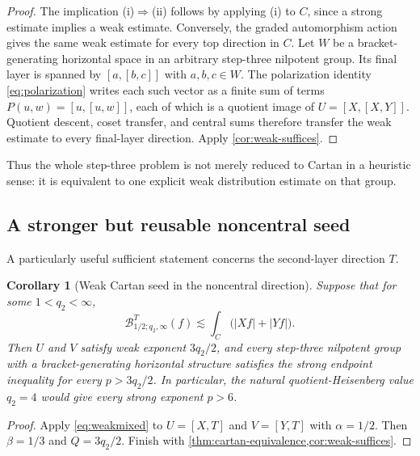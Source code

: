 \documentclass[11pt]{article}
\newtheorem{corollary}[theorem]{Corollary}
\theoremstyle{definition}
\theoremstyle{remark}
\newcommand{\abs}[1]{\lvert #1\rvert}
\newcommand{\Bw}[3]{\mathcal B^{#1}_{#2;#3,\infty}}
\newcommand{\less}{\lesssim}
\begin{document}
\begin{proof}
The implication (i)\(\Rightarrow\)(ii) follows by applying (i) to \(C\), since a strong
estimate implies a weak estimate.  Conversely, the graded automorphism action gives the same weak estimate for every top
direction in \(C\).  Let \(W\) be a bracket-generating horizontal space in an arbitrary
step-three nilpotent group.  Its final layer is spanned by \([a,[b,c]]\) with
\(a,b,c\in W\).  The polarization identity \eqref{eq:polarization} writes each such vector
as a finite sum of terms \(P(u,w)=[u,[u,w]]\), each of which is a quotient image of
\(U=[X,[X,Y]]\).  Quotient descent, coset transfer, and central sums therefore transfer
the weak estimate to every final-layer direction.  Apply \cref{cor:weak-suffices}.
\end{proof}

Thus the whole step-three problem is not merely reduced to Cartan in a heuristic sense:
it is equivalent to one explicit weak distribution estimate on that group.

\subsection{A stronger but reusable noncentral seed}

A particularly useful sufficient statement concerns the second-layer direction \(T\).

\begin{corollary}[Weak Cartan seed in the noncentral direction]\label{cor:Tseed}
Suppose that for some \(1<q_2<\infty\),
\begin{equation}\label{eq:Tweak}
 \Bw{T}{1/2}{q_2}(f)
 \less\int_C\bigl(\abs{Xf}+\abs{Yf}\bigr).
\end{equation}
Then \(U\) and \(V\) satisfy weak exponent \(3q_2/2\), and every step-three nilpotent
group with a bracket-generating horizontal structure satisfies the strong endpoint
inequality for every
\(p>3q_2/2\).  In particular, the natural quotient-Heisenberg value \(q_2=4\) would give
every strong exponent \(p>6\).
\end{corollary}

\begin{proof}
Apply \eqref{eq:weakmixed} to \(U=[X,T]\) and \(V=[Y,T]\) with
\(\alpha=1/2\).  Then \(\beta=1/3\) and \(Q=3q_2/2\).  Finish with
\cref{thm:cartan-equivalence,cor:weak-suffices}.
\end{proof}
\end{document}
